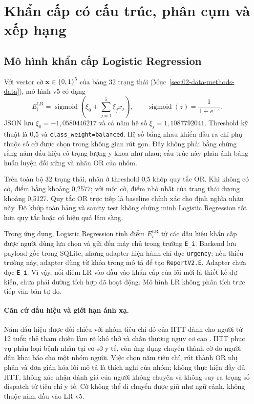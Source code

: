 \section{Khẩn cấp có cấu trúc, phân cụm và xếp hạng}\label{sec:02-data-methods-methods}
\subsection{Mô hình khẩn cấp Logistic Regression}\label{sec:02-urgency-lr}
Với vector cờ $\symbf{x}\in\{0,1\}^{5}$ của bảng 32 trạng thái (Mục~\ref{sec:02-data-methods-data}), mô hình v5 có dạng
\begin{equation}
 E_i^{\mathrm{LR}}=\operatorname{sigmoid}\!\left(\xi_0+\sum_{j=1}^{5}\xi_jx_j\right),
 \qquad \operatorname{sigmoid}(z)=\frac{1}{1+e^{-z}}.
 \label{eq:urgency-lr}
\end{equation}
JSON lưu $\xi_0=-1{,}0580446217$ và cả năm hệ số $\xi_j=1{,}1087792041$. Threshold kỹ thuật là 0,5 và \texttt{class\_weight=balanced}. Hệ số bằng nhau khiến đầu ra chỉ phụ thuộc số cờ được chọn trong không gian rút gọn. Đây không phải bằng chứng rằng năm dấu hiệu có trọng lượng y khoa như nhau; cấu trúc này phản ánh bảng huấn luyện đối xứng và nhãn OR của nhóm.

Trên toàn bộ 32 trạng thái, nhãn ở threshold 0,5 khớp quy tắc OR. Khi không có cờ, điểm bằng khoảng 0,2577; với một cờ, điểm nhỏ nhất của trạng thái dương khoảng 0,5127. Quy tắc OR trực tiếp là baseline chính xác cho định nghĩa nhãn này. Độ khớp toàn bảng và sanity test không chứng minh Logistic Regression tốt hơn quy tắc hoặc có hiệu quả lâm sàng.

Trong ứng dụng, Logistic Regression tính điểm $E_i^{\mathrm{LR}}$ từ các dấu hiệu khẩn cấp được người dùng lựa chọn và gửi đến máy chủ trong trường \texttt{E\_i}. Backend lưu payload gốc trong SQLite, nhưng adapter hiện hành chỉ đọc \texttt{urgency}; nếu thiếu trường này, adapter dùng từ khóa trong mô tả để tạo \texttt{ReportV2.E}. Adapter chưa đọc \texttt{E\_i}. Vì vậy, nối điểm LR vào đầu vào khẩn cấp của lõi mới là thiết kế dự kiến, chưa phải đường tích hợp đã hoạt động. Mô hình LR không phân tích trực tiếp văn bản tự do.

\paragraph{Căn cứ dấu hiệu và giới hạn ánh xạ.} Năm dấu hiệu được đối chiếu với nhóm tiêu chí đỏ của IITT dành cho người từ 12 tuổi; thẻ tham chiếu làm rõ khó thở và chấn thương nguy cơ cao \citep{whoIITT,whoIITTAdult,whoIITTReference}. IITT phục vụ phân loại bệnh nhân tại cơ sở y tế, còn ứng dụng chuyển thành cờ do người dân khai báo cho một nhóm người. Việc chọn năm tiêu chí, rút thành OR nhị phân và đơn giản hóa lời mô tả là thích nghi của nhóm; không thực hiện đầy đủ IITT, không xác nhận đánh giá của người không chuyên và không suy ra trọng số dispatch từ tiêu chí y tế. Cờ không thể di chuyển được giữ như ngữ cảnh, không thuộc năm đầu vào LR v5.

